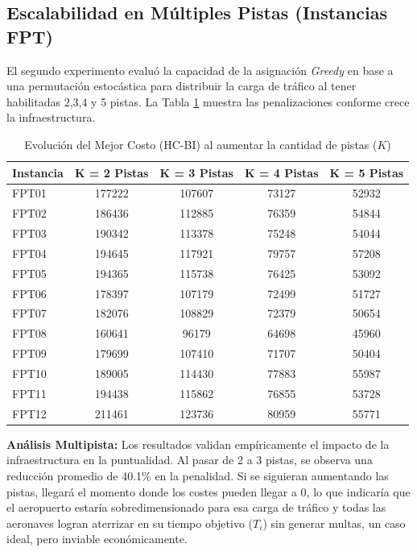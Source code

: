 \documentclass[letter, 10pt]{article}
\begin{document}
\subsection{Escalabilidad en Múltiples Pistas (Instancias FPT)}
El segundo experimento evaluó la capacidad de la asignación \textit{Greedy} en base a una permutación estocástica para distribuir la carga de tráfico al tener habilitadas 2,3,4 y 5 pistas. La Tabla \ref{tab:multipista} muestra las penalizaciones conforme crece la infraestructura.

\begin{table}[h]
\centering
\caption{Evolución del Mejor Costo (HC-BI) al aumentar la cantidad de pistas ($K$)}
\label{tab:multipista}
\begin{tabular}{|l|c|c|c|c|}
\hline
\textbf{Instancia} & \textbf{K = 2 Pistas} & \textbf{K = 3 Pistas} & \textbf{K = 4 Pistas} & \textbf{K = 5 Pistas} \\ \hline
FPT01 & 177222 & 107607 & 73127 & 52932 \\ \hline
FPT02 & 186436 & 112885 & 76359 & 54844 \\ \hline
FPT03 & 190342 & 113378 & 75248 & 54044 \\ \hline
FPT04 & 194645 & 117921 & 79757 & 57208 \\ \hline
FPT05 & 194365 & 115738 & 76425 & 53092 \\ \hline
FPT06 & 178397 & 107179 & 72499 & 51727 \\ \hline
FPT07 & 182076 & 108829 & 72379 & 50654 \\ \hline
FPT08 & 160641 & 96179  & 64698 & 45960 \\ \hline
FPT09 & 179699 & 107410 & 71707 & 50404 \\ \hline
FPT10 & 189005 & 114430 & 77883 & 55987 \\ \hline
FPT11 & 194438 & 115862 & 76855 & 53728 \\ \hline
FPT12 & 211461 & 123736 & 80959 & 55771 \\ \hline
\hline
\end{tabular}
\end{table}

\textbf{Análisis Multipista:} Los resultados validan empíricamente el impacto de la infraestructura en la puntualidad. Al pasar de 2 a 3 pistas, se observa una reducción promedio de 40.1\% en la penalidad. Si se siguieran aumentando las pistas, llegará el momento donde los costes pueden llegar a 0, lo que indicaría que el aeropuerto estaría sobredimensionado para esa carga de tráfico y todas las aeronaves logran aterrizar en su tiempo objetivo ($T_i$) sin generar multas, un caso ideal, pero inviable económicamente.
\end{document}
